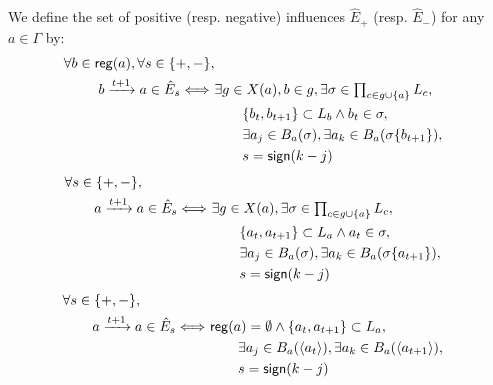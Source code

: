 \begin{proposition}\label{pps:inference-edges}
We define the set of positive (resp. negative) influences $\hat{E}_+$ (resp. $\hat{E}_-$) for any $a\in\Gamma$ by:
\begin{align}
\begin{split}\label{eq:edges-inference}
  \forall b\in\mathsf{reg}({a}), \forall s \in \{ +, - \}, \\
  b \xrightarrow{t+1} a \in \hat{E}_s \Longleftrightarrow\ & \exists g \in X(a), b \in g,
  \exists \sigma \in \textstyle\prod_{c\in g \cup \{ a \}} L_c, \\
    &\qquad \{ b_t, b_{t+1} \} \subset L_b \wedge b_t \in \sigma,\\
    &\qquad \exists a_j \in B_a(\sigma), \exists a_k \in B_a(\sigma\{b_{t+1}\}), \\
    &\qquad s = \mathsf{sign}(k - j)
\end{split}
\end{align}
\begin{align}
\begin{split}\label{eq:edges-inference-auto}
  \forall s \in \{ +, - \}, \quad\qquad\qquad \\
  a \xrightarrow{t+1} a \in \hat{E}_s \Longleftrightarrow\ & \exists g \in X(a),
  \exists \sigma \in \textstyle\prod_{c\in g \cup \{ a \}} L_c, \\
    &\qquad \{ a_t, a_{t+1} \} \subset L_a \wedge a_t \in \sigma,\\
    &\qquad \exists a_j \in B_a(\sigma), \exists a_k \in B_a(\sigma\{a_{t+1}\}), \\
    &\qquad s = \mathsf{sign}(k - j)
\end{split}
\end{align}
\begin{align}
\begin{split}\label{eq:edges-inference-noreg}
  \forall s \in \{ +, - \}, \quad\qquad\qquad \\
  a \xrightarrow{t+1} a \in \hat{E}_s \Longleftrightarrow\ & \mathsf{reg}({a}) = \emptyset \wedge \{ a_t, a_{t+1} \} \subset L_a, \\
    &\qquad \exists a_j \in B_a(\mbox{$\langle a_t \rangle$}), \exists a_k \in B_a(\mbox{$\langle a_{t+1} \rangle$}), \\
    &\qquad s = \mathsf{sign}(k - j)
\end{split}
\end{align}

\end{proposition}
